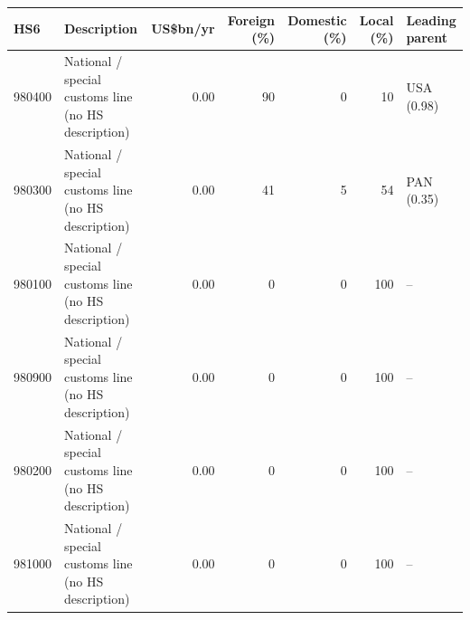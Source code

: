 \begin{tabular}{@{}l p{6.4cm} r r r r l@{}}
\toprule
HS6 & Description & US\$bn/yr & Foreign (\%) & Domestic (\%) & Local (\%) & Leading parent \\
\midrule
980400 & National /\allowbreak{} special customs line (no HS description) & 0.00 & 90 & 0 & 10 & USA (0.98) \\
980300 & National /\allowbreak{} special customs line (no HS description) & 0.00 & 41 & 5 & 54 & PAN (0.35) \\
980100 & National /\allowbreak{} special customs line (no HS description) & 0.00 & 0 & 0 & 100 & -- \\
980900 & National /\allowbreak{} special customs line (no HS description) & 0.00 & 0 & 0 & 100 & -- \\
980200 & National /\allowbreak{} special customs line (no HS description) & 0.00 & 0 & 0 & 100 & -- \\
981000 & National /\allowbreak{} special customs line (no HS description) & 0.00 & 0 & 0 & 100 & -- \\
\bottomrule
\end{tabular}
